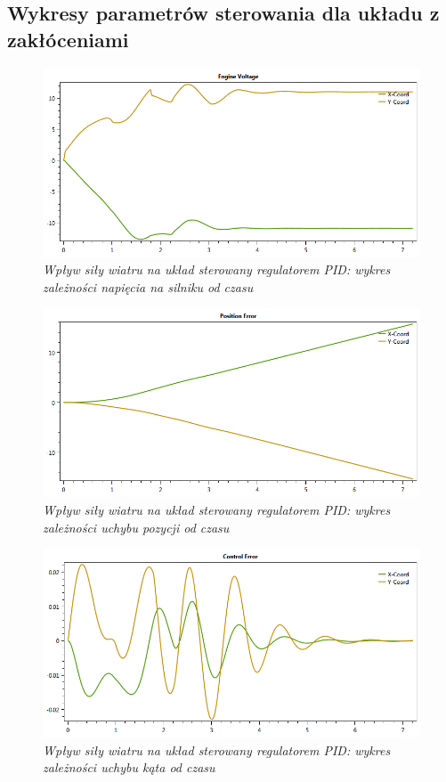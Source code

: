 \documentclass[12pt, twoside, openany]{report}
\theoremstyle{definition}
\begin{document}
\begin{appendices}
  \chapter{Wykresy parametrów sterowania dla układu z zakłóceniami}
\label{appendix:B}
\begin{figure}[H]
	\centering
		\includegraphics[width = 400pt]{WindPIDEV} 
		\caption{\textit{Wpływ siły wiatru na układ sterowany regulatorem PID: wykres zależności napięcia na silniku od czasu}}
		\label{plot:WindPIDEV}
\end{figure}

\begin{figure}[H]
	\centering
		\includegraphics[width = 400pt]{WindPIDCEP} 
		\caption{\textit{Wpływ siły wiatru na układ sterowany regulatorem PID: wykres zależności uchybu pozycji od czasu}}
		\label{plot:WindPIDCEP}
\end{figure}

\begin{figure}[H]
	\centering
		\includegraphics[width = 400pt]{WindPIDCEA} 
		\caption{\textit{Wpływ siły wiatru na układ sterowany regulatorem PID: wykres zależności uchybu kąta od czasu}}
		\label{plot:WindPIDCEA}
\end{figure}

  
\end{appendices}
\end{document}
